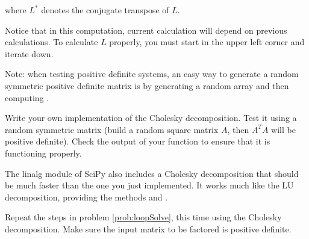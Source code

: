 where $L^*$ denotes the conjugate transpose of $L$.

Notice that in this computation, current calculation will depend on previous calculations. To calculate $L$ properly, you must start in the upper left corner and iterate down.

Note: when testing positive definite systems, an easy way to generate a random symmetric positive definite matrix is by generating a random array  and then computing .

\begin{problem}
Write your own implementation of the Cholesky decomposition.
Test it using a random symmetric matrix (build a random square matrix $A$, then $A^TA$ will be positive definite).
Check the output of your function to ensure that it is functioning properly.
\end{problem}


The linalg module of SciPy also includes a Cholesky decomposition that should be much faster than the one you just implemented. It works much like the LU decomposition, providing the methods  and .

\begin{problem}
Repeat the steps in problem \ref{prob:loopSolve}, this time using the
Cholesky decomposition. Make sure the input matrix to be factored is
positive definite.
\end{problem} 
